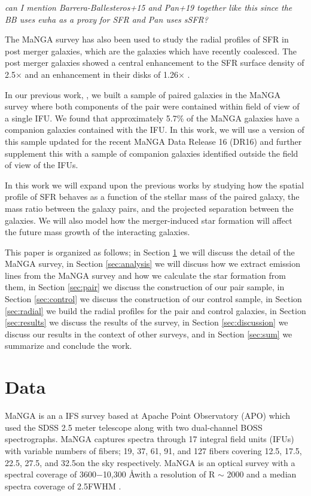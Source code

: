 \documentclass[iop,revtex4,twocolumn,apj,numberedappendix,appendixfloats]{emulateapj}
\begin{document}
{\it can I mention Barrera-Ballesteros+15 and Pan+19 together like this since the BB uses ewha as a proxy for SFR and Pan uses sSFR?}

The MaNGA survey has also been used to study the radial profiles of SFR in post merger galaxies, which are the galaxies which have recently coalesced. The post merger galaxies showed a central enhancement to the SFR surface density of 2.5$\times$ and an enhancement in their disks of 1.26$\times$ \citep{Thorp:2019}.

In our previous work, \citet{Fu:2018}, we built a sample of paired galaxies in the MaNGA survey where both components of the pair were contained within field of view of a single IFU. We found that approximately 5.7\% of the MaNGA galaxies have a companion galaxies contained with the IFU. In this work, we will use a version of this sample updated for the recent MaNGA Data Release 16 (DR16) and further supplement this with a sample of companion galaxies identified outside the field of view of the IFUs. 

In this work we will expand upon the previous works by studying how the spatial profile of SFR behaves as a function of the stellar mass of the paired galaxy, the mass ratio between the galaxy pairs, and the projected separation between the galaxies. We will also model how the merger-induced star formation will affect the future mass growth of the interacting galaxies. 

This paper is organized as follows; in Section \ref{sec:data} we will discuss the detail of the MaNGA survey, in Section \ref{sec:analysis} we will discuss how we extract emission lines from the MaNGA survey and how we calculate the star formation from them, in Section \ref{sec:pair} we discuss the construction of our pair sample, in Section \ref{sec:control} we discuss the construction of our control sample, in Section \ref{sec:radial} we build the radial profiles for the pair and control galaxies, in Section \ref{sec:results} we discuss the results of the survey, in Section \ref{sec:discussion} we discuss our results in the context of other surveys, and in Section \ref{sec:sum} we summarize and conclude the work. 

\section{Data}\label{sec:data}

MaNGA is an a IFS survey based at Apache Point Observatory (APO) which used the SDSS 2.5 meter telescope along with two dual-channel BOSS spectrographs. MaNGA captures spectra through 17 integral field units (IFUs) with variable numbers of fibers; 19, 37, 61, 91, and 127 fibers covering 12.5\arcsec, 17.5\arcsec, 22.5\arcsec, 27.5\arcsec, and 32.5\arcsec on the sky respectively. MaNGA is an optical survey with a spectral coverage of 3600$-$10,300 \AA with a resolution of R $\sim$ 2000 and a median spectra coverage of 2.5\arcsec FWHM \citep{Bundy:2015}. 
\end{document}

